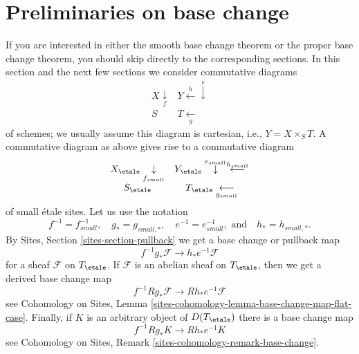 \section{Preliminaries on base change}
\label{etale-cohomology-section-base-change-preliminaries}
If you are interested in either the smooth base change theorem
or the proper base change theorem, you should skip directly to
the corresponding sections.
In this section and the next few sections we consider commutative diagrams
$$
\begin{array}{cc}X \underset{f}{\downarrow} & Y \overset{h}{\longleftarrow}\overset{e}{\downarrow} \\ S & T \underset{g}{\longleftarrow}\end{array}
$$
of schemes; we usually assume this diagram is cartesian,
i.e., $Y = X \times_S T$. A commutative diagram as above
gives rise to a commutative diagram
$$
\begin{array}{cc}X_\etale \underset{f_{small}}{\downarrow} & Y_\etale \overset{e_{small}}{\downarrow}\overset{h_{small}}{\longleftarrow} \\ S_\etale & T_\etale \underset{g_{small}}{\longleftarrow}\end{array}
$$
of small \'etale sites. Let us use the notation
$$
f^{-1} = f_{small}^{-1}, \quad
g_* = g_{small, *}, \quad
e^{-1} = e_{small}^{-1}, \text{ and}\quad
h_* = h_{small, *}.
$$
By Sites, Section \ref{sites-section-pullback}
we get a base change or pullback map
$$
f^{-1}g_*\mathcal{F}
\longrightarrow
h_*e^{-1}\mathcal{F}
$$
for a sheaf $\mathcal{F}$ on $T_\etale$. If $\mathcal{F}$ is an abelian
sheaf on $T_\etale$, then we get a derived base change map
$$
f^{-1}Rg_*\mathcal{F}
\longrightarrow
Rh_*e^{-1}\mathcal{F}
$$
see Cohomology on Sites, Lemma
\ref{sites-cohomology-lemma-base-change-map-flat-case}.
Finally, if $K$ is an arbitrary object of $D(T_\etale)$
there is a base change map
$$
f^{-1}Rg_*K
\longrightarrow
Rh_*e^{-1}K
$$
see
Cohomology on Sites, Remark \ref{sites-cohomology-remark-base-change}.

